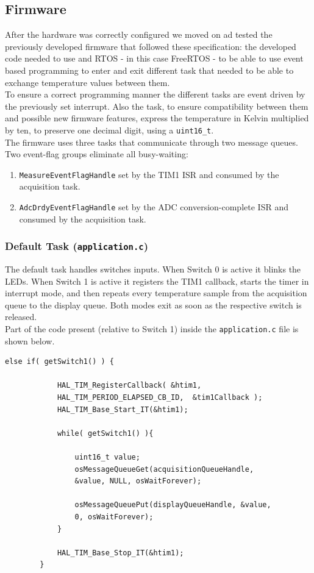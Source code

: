 \documentclass[../main.tex]{subfiles}
\begin{document}
\subsection{Firmware}

After the hardware was correctly configured we moved on ad tested the previously developed firmware that followed these specification: the developed code needed to use and RTOS - in this case FreeRTOS - to be able to use event based programming to enter and exit different task that needed to be able to exchange temperature values between them.\\

To ensure a correct programming manner the different tasks are event driven by the previously set interrupt. Also the task, to ensure compatibility between them and possible new firmware features, express the temperature in Kelvin multiplied by ten, to preserve one decimal digit, using a \texttt{uint16\_t}.\\

The firmware uses three tasks that communicate through two message queues. Two event-flag groups eliminate all busy-waiting:

\begin{enumerate}[label=\textbf{-}]
	\item \texttt{MeasureEventFlagHandle} set by the TIM1 ISR and consumed by the acquisition task.
	\item \texttt{AdcDrdyEventFlagHandle} set by the ADC conversion-complete ISR and consumed by the acquisition task.
\end{enumerate}

\subsubsection*{Default Task (\texttt{application.c})}

The default task handles switches inputs. 
When Switch 0 is active it blinks the LEDs. When Switch 1 is active it registers the TIM1 callback, starts the timer in interrupt mode, and then repeats every temperature sample from the acquisition queue to the display queue. Both modes exit as soon as the respective switch is released.\\

Part of the code present (relative to Switch 1) inside the \texttt{application.c} file is shown below.

\begin{lstlisting}
else if( getSwitch1() ) {

			HAL_TIM_RegisterCallback( &htim1, 
			HAL_TIM_PERIOD_ELAPSED_CB_ID,  &tim1Callback );
			HAL_TIM_Base_Start_IT(&htim1);

			while( getSwitch1() ){

				uint16_t value;
				osMessageQueueGet(acquisitionQueueHandle, 
				&value, NULL, osWaitForever);
				
				osMessageQueuePut(displayQueueHandle, &value, 
				0, osWaitForever);
			}

			HAL_TIM_Base_Stop_IT(&htim1);
		}
			
\end{lstlisting}
\end{document}
